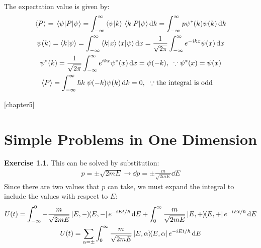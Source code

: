 \documentclass{report}
\theoremstyle{definition}
\newcounter{subpart1}[chapter1]
\begin{document}
\begin{chapter4}\label{prob: 2}
	The expectation value is given by:
		\begin{gather*}
			\ev{P} = \ev{P}{\psi} = \int_{-\infty}^{\infty} \braket{\psi}{k}\mel*{k}{P}{\psi}\dd{k} =  \int_{-\infty}^{\infty}p\psi^*(k)\psi(k)\dd{k} \\
			\psi(k) = \braket{k}{\psi} = \int_{-\infty}^{\infty} \braket{k}{x}\braket{x}{\psi}\dd{x} = \frac{1}{\sqrt{2\pi}}\int_{-\infty}^{\infty} e^{-ikx}\psi(x)\dd{x} \\
			\psi^*(k) = \frac{1}{\sqrt{2\pi}} \int_{-\infty}^{\infty} e^{ikx}\psi^*(x) \dd{x} = \psi(-k), \;\; \because \psi^*(x) = \psi(x) \\
			\ev{P} = \int_{-\infty}^{\infty} \hbar k \;\psi(-k)\psi(k) \dd{k} = 0, \;\;\because\qq*{the integral is odd}
		\end{gather*}
\end{chapter4}

\begin{chapter4}\label{prob: 3}
	
\end{chapter4}

\begin{chapter4}\label{prob: 4}
	
\end{chapter4}

\newtheorem{chapter5}{Exercise}
[chapter5]

\chapter{Simple Problems in One Dimension}

\begin{chapter5}\label{prob: 1}
	This can be solved by substitution:
		\begin{gather*}
			p = \pm\sqrt{2mE} \longrightarrow \dd{p} = \pm\frac{m}{\sqrt{2mE}}\dd{E}
		\end{gather*}
		Since there are two values that $p$ can take, we must expand the integral to include the values with respect to $E$:
		\begin{gather*}
			U(t) = \int_{-\infty}^0 -\frac{m}{\sqrt{2mE}} \op{E,-} e^{-iEt/\hbar} \dd{E} + \int_{0}^{\infty} \frac{m}{\sqrt{2mE}} \op{E,+} e^{-iEt/\hbar} \dd{E} \\
			U(t) = \sum_{\alpha = \pm} \int_{0}^{\infty} \frac{m}{\sqrt{2mE}} \op{E,\alpha} e^{-iEt/\hbar} \dd{E}
		\end{gather*}
\end{chapter5}
\end{document}
